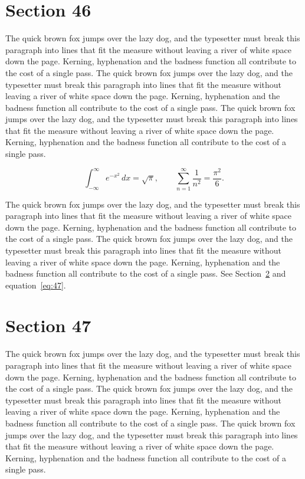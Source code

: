 \documentclass{article}
\begin{document}
\section{Section 46}
\label{sec:46}
The quick brown fox jumps over the lazy dog, and the typesetter must break this paragraph into lines that fit the measure without leaving a river of white space down the page. Kerning, hyphenation and the badness function all contribute to the cost of a single pass. The quick brown fox jumps over the lazy dog, and the typesetter must break this paragraph into lines that fit the measure without leaving a river of white space down the page. Kerning, hyphenation and the badness function all contribute to the cost of a single pass. The quick brown fox jumps over the lazy dog, and the typesetter must break this paragraph into lines that fit the measure without leaving a river of white space down the page. Kerning, hyphenation and the badness function all contribute to the cost of a single pass. 

\begin{equation}\label{eq:46}
\int_{-\infty}^{\infty} e^{-x^{2}}\,dx = \sqrt{\pi}, \qquad
\sum_{n=1}^{\infty} \frac{1}{n^{2}} = \frac{\pi^{2}}{6}.
\end{equation}

The quick brown fox jumps over the lazy dog, and the typesetter must break this paragraph into lines that fit the measure without leaving a river of white space down the page. Kerning, hyphenation and the badness function all contribute to the cost of a single pass. The quick brown fox jumps over the lazy dog, and the typesetter must break this paragraph into lines that fit the measure without leaving a river of white space down the page. Kerning, hyphenation and the badness function all contribute to the cost of a single pass. 
See Section~\ref{sec:47} and equation~\eqref{eq:47}.
\section{Section 47}
\label{sec:47}
The quick brown fox jumps over the lazy dog, and the typesetter must break this paragraph into lines that fit the measure without leaving a river of white space down the page. Kerning, hyphenation and the badness function all contribute to the cost of a single pass. The quick brown fox jumps over the lazy dog, and the typesetter must break this paragraph into lines that fit the measure without leaving a river of white space down the page. Kerning, hyphenation and the badness function all contribute to the cost of a single pass. The quick brown fox jumps over the lazy dog, and the typesetter must break this paragraph into lines that fit the measure without leaving a river of white space down the page. Kerning, hyphenation and the badness function all contribute to the cost of a single pass. 
\end{document}
